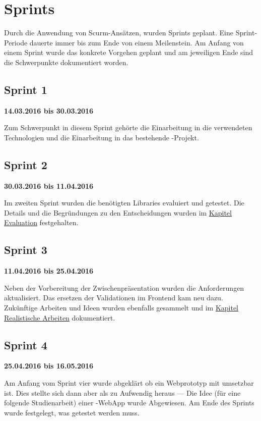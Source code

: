 \section{Sprints}
Durch die Anwendung von Scurm-Ansätzen, wurden Sprints geplant. 
Eine Sprint-Periode dauerte immer bis zum Ende von einem Meilenstein. 
Am Anfang von einem Sprint wurde das konkrete Vorgehen geplant und am jeweiligen Ende sind die Schwerpunkte dokumentiert worden.


\subsection{Sprint 1}
\textbf{14.03.2016 bis 30.03.2016}

Zum Schwerpunkt in diesem Sprint gehörte die Einarbeitung in die verwendeten Technologien und die Einarbeitung in das bestehende \kort{}-Projekt.

\subsection{Sprint 2}
\textbf{30.03.2016 bis 11.04.2016}

Im zweiten Sprint wurden die benötigten Libraries evaluiert und getestet.
Die Details und die Begründungen zu den Entscheidungen wurden im \hyperref[tb-evaluation]{Kapitel Evaluation} festgehalten.

\subsection{Sprint 3}
\textbf{11.04.2016 bis 25.04.2016}

Neben der Vorbereitung der Zwischenpräsentation wurden die Anforderungen aktualisiert. 
Das ersetzen der Validationen im Frontend kam neu dazu. 
Zukünftige Arbeiten und Ideen wurden ebenfalls gesammelt und im \hyperref[pd-weiterentwicklung-realistisch]{Kapitel Realistische Arbeiten} dokumentiert.

\subsection{Sprint 4}
\textbf{25.04.2016 bis 16.05.2016}

Am Anfang vom Sprint vier wurde abgeklärt ob ein Webprototyp mit  umsetzbar ist. 
Dies stellte sich dann aber als zu Aufwendig heraus --- Die Idee (für eine folgende Studienarbeit) einer -\gls{WebApp} wurde Abgewiesen.
Am Ende des Sprints wurde festgelegt, was getestet werden muss.

